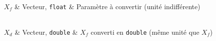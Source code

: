 \begin{tabarg}
\\
\hline
$X_f$ & Vecteur, \texttt{float} & Param\`etre \`a convertir (unit\'e indiff\'erente)\\
\end{tabarg}

\medskip
\begin{tabarg}
\\
\hline
$X_d$ & Vecteur, \texttt{double} &  $X_f$ converti en \texttt{double} (m\^eme unit\'e que $X_f$)\\
\end{tabarg}
